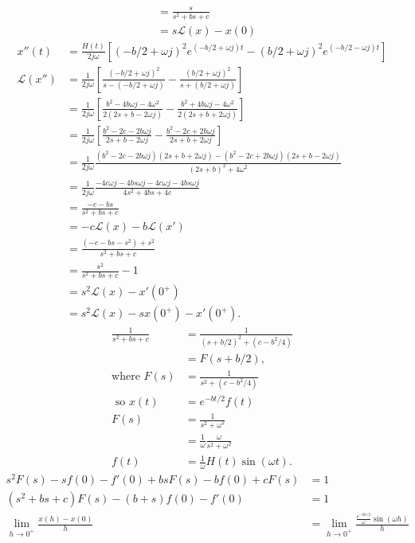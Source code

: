 \documentclass{article}
\begin{document}
\begin{enumerate}
\begin{align*}
			&=\frac{s}{s^2+bs+c}\\
			&=s\mathcal{L}(x)-x(0)
			\end{align*}
			\begin{align*}
			x''(t) &= \frac{H(t)}{2j\omega}\left[(-b/2+\omega j)^2e^{(-b/2+\omega j)t}-(b/2+\omega j)^2e^{(-b/2-\omega j)t}\right]\\
			\mathcal{L}(x'')&=\frac{1}{2j\omega}\left[\frac{(-b/2+\omega j)^2}{s-(-b/2+\omega j)}-\frac{(b/2+\omega j)^2}{s+(b/2+\omega j)}\right]\\
			&=\frac{1}{2j\omega}\left[\frac{b^2-4b\omega j - 4\omega^2}{2(2s+b-2\omega j)}-\frac{b^2+4b\omega j - 4\omega^2}{2(2s+b+2\omega j)}\right]\\
			&=\frac{1}{2j\omega}\left[\frac{b^2-2c-2b\omega j}{2s+b-2\omega j} - \frac{b^2 -2c+ 2b\omega j}{2s+b+2\omega j}\right]\\
			&=\frac{1}{2j\omega}\frac{(b^2-2c-2b\omega j)(2s+b+2\omega j)- (b^2-2c+2b\omega j)(2s+b-2\omega j)}{(2s+b)^2+4\omega^2}\\
			&=\frac{1}{2j\omega}\frac{ -4c\omega j - 4bs\omega j -4c\omega j - 4bs\omega j }{4s^2+4bs + 4c}\\
			&=\frac{-c-bs}{s^2+bs+c}\\
			&=-c\mathcal{L}(x)-b\mathcal{L}(x')\\
			&= \frac{(-c-bs-s^2)+s^2}{s^2+bs+c}\\
			&=\frac{s^2}{s^2+bs+c} - 1\\
			&=s^2\mathcal{L}(x)-x'(0^+)\\
			&=s^2\mathcal{L}(x) -sx(0^+)-x'(0^+).
		\end{align*}
		\begin{align*}
			\frac{1}{s^2+bs+c} &= \frac{1}{(s+b/2)^2 + (c-b^2/4)}\\
			&= F(s+b/2),\\
			\mbox{where } F(s)&=\frac{1}{s^2+(c-b^2/4)}\\
			\mbox{ so } x(t)&=e^{-bt/2}f(t)\\
			F(s)&=\frac{1}{s^2+\omega^2}\\
			&=\frac{1}{\omega}\frac{\omega}{s^2+\omega^2}\\
			f(t) &= \frac{1}{\omega}H(t)\sin(\omega t).
		\end{align*}
		\begin{align*}
			s^2F(s)-sf(0)-f'(0) + bsF(s) - bf(0) + cF(s) &= 1\\
			(s^2+bs+c)F(s) - (b+s)f(0) - f'(0)&=1\\
			\lim_{h\to 0^+}\frac{x(h)-x(0)}{h} &= \lim_{h\to 0^+}\frac{\frac{e^{-bh/2}}{\omega}\sin(\omega h)}{h}\\

\end{align*}
\end{enumerate}
\end{document}
